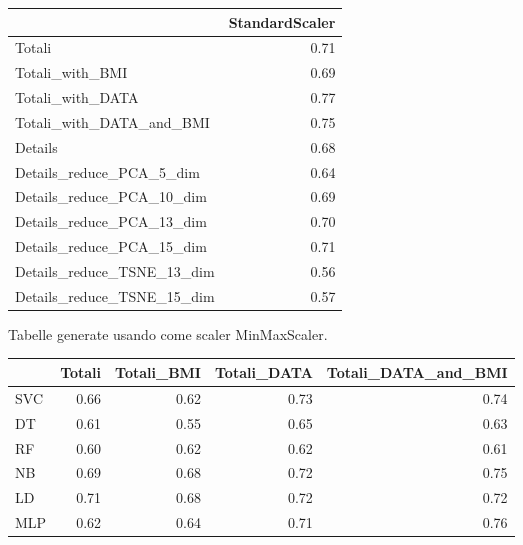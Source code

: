 \documentclass[12pt,italian]{report}
\begin{document}
\begin{table}[h]
	\begin{center}
		\begin{adjustbox}{max width=\textwidth, max totalheight= {5.5cm}}
			\begin{tabular}{lr}
				\toprule
				{} &  StandardScaler \\
				\midrule
				Totali                     &        0.71 \\
				Totali\_with\_BMI            &        0.69 \\
				Totali\_with\_DATA           &        0.77 \\
				Totali\_with\_DATA\_and\_BMI   &        0.75 \\
				Details                    &        0.68 \\
				Details\_reduce\_PCA\_5\_dim   &        0.64 \\
				Details\_reduce\_PCA\_10\_dim  &        0.69 \\
				Details\_reduce\_PCA\_13\_dim  &        0.70 \\
				Details\_reduce\_PCA\_15\_dim  &        0.71 \\
				Details\_reduce\_TSNE\_13\_dim &        0.56 \\
				Details\_reduce\_TSNE\_15\_dim &        0.57 \\
				\bottomrule
			\end{tabular}
		\end{adjustbox}
	\end{center}
\end{table}

\newpage

Tabelle generate usando come scaler MinMaxScaler.
\begin{table}[h]
	\begin{center}
		\begin{adjustbox}{max width=\textwidth, max totalheight= {3.3cm}}
			\begin{tabular}{lrrrr}
				\toprule
				{} &    Totali &  Totali\_BMI &  Totali\_DATA &  Totali\_DATA\_and\_BMI \\
				\midrule
				SVC &  0.66 &         0.62 &          0.73 &                  0.74 \\
				DT  &  0.61 &         0.55 &          0.65 &                  0.63 \\
				RF  &  0.60 &         0.62 &          0.62 &                  0.61 \\
				NB  &  0.69 &         0.68 &          0.72 &                  0.75 \\
				LD  &  0.71 &         0.68 &          0.72 &                  0.72\\
				MLP &  0.62 &         0.64 &          0.71 &                  0.76\\
				\bottomrule
			\end{tabular}
		\end{adjustbox}
	\end{center}
\end{table}
\end{document}
